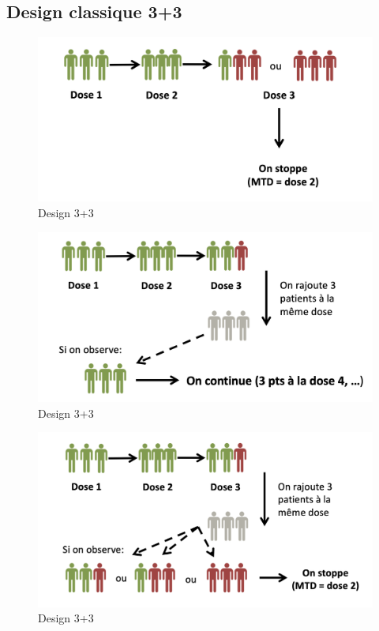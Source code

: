 \subsection{Design classique 3+3}

\begin{figure}[H]
    \centering
    \includegraphics[scale=0.3]{images/3et31.png}
    \caption{Design 3+3}
    \label{fig:Design3et31}
\end{figure}

\begin{figure}[H]
    \centering
    \includegraphics[scale=0.3]{images/3et32.png}
    \caption{Design 3+3}
    \label{fig:Design3et32}
\end{figure}

\begin{figure}[H]
    \centering
    \includegraphics[scale=0.3]{images/3et33.png}
    \caption{Design 3+3}
    \label{fig:Design3et33}
\end{figure}
